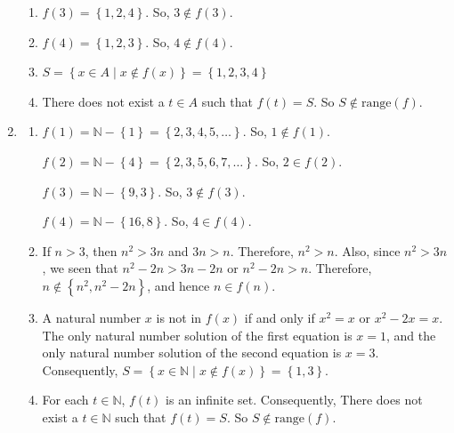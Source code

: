 \documentclass[11pt]{article}
\begin{document}
\begin{enumerate}
\begin{enumerate}
\item $f \left( 3 \right) = \left\{ 1, 2, 4 \right\}$.  So, $3 \notin f \left( 3 \right)$.

\item $f \left( 4 \right) = \left\{ 1, 2, 3 \right\}$.  So, $4 \notin f \left( 4 \right)$.

\item $S = \left\{ x \in A \mid x \notin f \left( x \right) \right\} = \left\{ 1, 2, 3, 4 \right\}$

\item There does not exist a $t \in A$ such that $f \left( t \right) = S$.  So 
$S \notin \text{range} \left( f \right)$.
\end{enumerate}


\item \begin{enumerate}
\item $f \left( 1 \right) = \mathbb{N} - \left\{ 1 \right\} = \left\{ 2, 3, 4, 5, \ldots \right\}$.  So, $1 \notin f \left( 1 \right)$.

$f \left( 2 \right) = \mathbb{N} - \left\{ 4 \right\} = \left\{ 2, 3, 5, 6, 7, \ldots \right\}$.  So, $2 \in f \left( 2 \right)$.

$f \left( 3 \right) = \mathbb{N} - \left\{ 9, 3 \right\}$.  So, $3 \notin f \left( 3 \right)$.

$f \left( 4 \right) = \mathbb{N} - \left\{ 16, 8 \right\}$.  So, $4 \in f \left( 4 \right)$.

\item If $n > 3$, then $n^2 > 3n$ and $3n > n$.   Therefore, $n^2 > n$.  Also, since $n^2 > 3n$, we seen that $n^2 - 2n > 3n - 2n$ or $n^2 - 2n > n$.  Therefore, 
$n \notin \left\{ n^2, n^2 - 2n \right\}$, and hence $n \in f \left( n \right)$.


\item A natural number $x$ is not in $f \left( x \right)$ if and only if 
$x^2 = x$ or $x^2 - 2x = x$.  The only natural number solution of the first equation is $x = 1$, and the only natural number solution of the second equation is $x = 3$.  Consequently, 
$S = \left\{ x \in \mathbb{N} \mid x \notin f \left( x \right) \right\} = \left\{ 1, 3 \right\}$.

\item For each $t \in \mathbb{N}$, $f \left( t \right)$ is an infinite set.  Consequently,  There does not exist a $t \in \mathbb{N}$ such that $f \left( t \right) = S$.  So 
$S \notin \text{range} \left( f \right)$.
\end{enumerate}
\end{enumerate}
\hbreak
\end{document}
